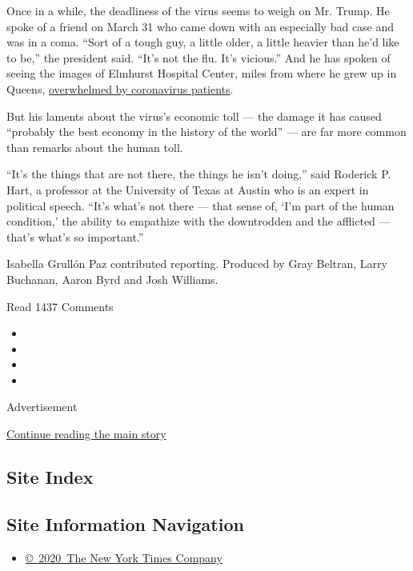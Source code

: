 Once in a while, the deadliness of the virus seems to weigh on Mr.
Trump. He spoke of a friend on March 31 who came down with an especially
bad case and was in a coma. ``Sort of a tough guy, a little older, a
little heavier than he'd like to be,'' the president said. ``It's not
the flu. It's vicious.'' And he has spoken of seeing the images of
Elmhurst Hospital Center, miles from where he grew up in Queens,
\href{https://www.nytimes3xbfgragh.onion/2020/03/25/nyregion/nyc-coronavirus-hospitals.html}{overwhelmed
by coronavirus patients}.

But his laments about the virus's economic toll --- the damage it has
caused ``probably the best economy in the history of the world'' --- are
far more common than remarks about the human toll.

``It's the things that are not there, the things he isn't doing,'' said
Roderick P. Hart, a professor at the University of Texas at Austin who
is an expert in political speech. ``It's what's not there --- that sense
of, `I'm part of the human condition,' the ability to empathize with the
downtrodden and the afflicted --- that's what's so important.''

Isabella Grullón Paz contributed reporting. Produced by Gray Beltran,
Larry Buchanan, Aaron Byrd and Josh Williams.

Read 1437 Comments

\begin{itemize}
\item
\item
\item
\item
\end{itemize}

Advertisement

\protect\hyperlink{after-bottom}{Continue reading the main story}

\hypertarget{site-index}{%
\subsection{Site Index}\label{site-index}}

\hypertarget{site-information-navigation}{%
\subsection{Site Information
Navigation}\label{site-information-navigation}}

\begin{itemize}
\tightlist
\item
  \href{https://help.nytimes3xbfgragh.onion/hc/en-us/articles/115014792127-Copyright-notice}{©~2020~The
  New York Times Company}
\end{itemize}

